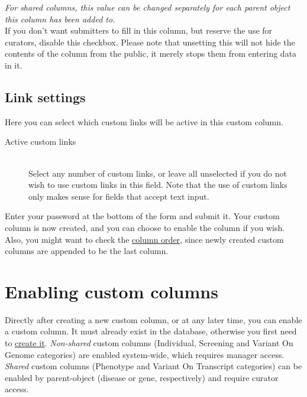 \documentclass[a4paper,oneside,openany,12pt]{memoir}
\begin{document}
\begin{description}
  \emph{For shared columns, this value can be changed separately for each parent object this column has been added to.}
  \\
  If you don't want submitters to fill in this column, but reserve the use for curators, disable this checkbox.
  Please note that unsetting this will not hide the contents of the column from the public, it merely stops them from entering data in it.
\end{description}



\subsection{Link settings}
Here you can select which custom links will be active in this custom column.
\begin{description}
  \item[Active custom links] \hfill \\
  Select any number of custom links, or leave all unselected if you do not wish to use custom links in this field.
  Note that the use of custom links only makes sense for fields that accept text input.
\end{description}

\noindent
Enter your password at the bottom of the form and submit it.
Your custom column is now created, and you can choose to enable the column if you wish.
Also, you might want to check the \hyperlink{sec:columns_order}{column order}, since newly created custom columns are appended to be the last column.





\section{Enabling custom columns}
Directly after creating a new custom column, or at any later time, you can enable a custom column.
It must already exist in the database, otherwise you first need to \hyperlink{sec:custom_column_create}{create it}.
\emph{Non-shared} custom columns (Individual, Screening and Variant On Genome categories) are enabled system-wide, which requires manager access.
\emph{Shared} custom columns (Phenotype and Variant On Transcript categories) can be enabled by parent-object (disease or gene, respectively) and require curator access.
\end{document}
